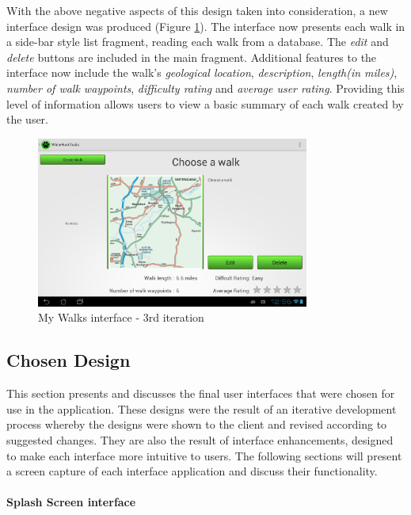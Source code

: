 \documentclass[11pt,a4paper]{report}
\begin{document}
With the above negative aspects of this design taken into consideration, a new interface design was produced (Figure \ref{fig:app_my walks_view2}). The interface now presents each walk in a side-bar style list fragment, reading each walk from a database. The \emph{edit} and \emph{delete} buttons are included in the main fragment. Additional features to the interface now include the walk's \emph{geological location}, \emph{description}, \emph{length(in miles)}, \emph{number of walk waypoints}, \emph{difficulty rating} and \emph{average user rating}. Providing this level of information allows users to view a basic summary of each walk created by the user.\\

\begin{figure}[H]
    \centering
    \includegraphics[width=0.8\textwidth]{chris/final_walk_view}
    \caption{My Walks interface - 3rd iteration}
    \label{fig:app_my walks_view2}
\end{figure}

\subsection{Chosen Design}
\label{sec:chosen-designs}

This section presents and discusses the final user interfaces that were chosen for use in the application. These designs were the result of an iterative development process whereby the designs were shown to the client and revised according to suggested changes. They are also the result of interface enhancements, designed to make each interface more intuitive to users. The following sections will present a screen capture of each interface application and discuss their functionality.

\paragraph*{Splash Screen interface}\mbox{}\\ 
\end{document}
